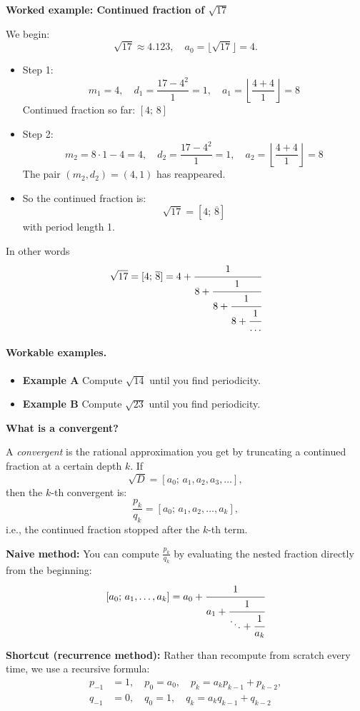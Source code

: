 \documentclass[11pt]{article}
\begin{document}
\bigskip
\noindent
\textbf{Worked example: Continued fraction of \( \sqrt{17} \)}

We begin:
\[
\sqrt{17} \approx 4.123, \quad a_0 = \lfloor \sqrt{17} \rfloor = 4.
\]

\begin{itemize}
  \item Step 1:
  \[
  m_1 = 4, \quad d_1 = \frac{17 - 4^2}{1} = 1, \quad a_1 = \left\lfloor \frac{4 + 4}{1} \right\rfloor = 8
  \]
  Continued fraction so far: \( [4;\,8] \)

  \item Step 2:
  \[
  m_2 = 8 \cdot 1 - 4 = 4, \quad d_2 = \frac{17 - 4^2}{1} = 1, \quad a_2 = \left\lfloor \frac{4 + 4}{1} \right\rfloor = 8
  \]
  The pair \( (m_2, d_2) = (4, 1) \) has reappeared.

  \item So the continued fraction is:
  \[
  \sqrt{17} = [4;\, \overline{8}]
  \]
  with period length 1.
\end{itemize}
\smallskip
\noindent
In other words
\[
\sqrt{17} = [4;\, \overline{8}] = 4 + \cfrac{1}{8 + \cfrac{1}{8 + \cfrac{1}{8 + \cfrac{1}{\dots}}}}
\]

\paragraph{Workable examples.}
\begin{itemize}
  \item \textbf{Example A} Compute $\sqrt{14}$ until you find periodicity.
  \item \textbf{Example B} Compute $\sqrt{23}$ until you find periodicity.
\end{itemize}

\smallskip
\noindent
\textbf{What is a convergent?}

A \emph{convergent} is the rational approximation you get by truncating a continued fraction at a certain depth \( k \). If
\[
\sqrt{D} = [a_0;\, a_1, a_2, a_3, \dots],
\]
then the \( k \)-th convergent is:
\[
\frac{p_k}{q_k} = [a_0;\, a_1, a_2, \dots, a_k],
\]
i.e., the continued fraction stopped after the \( k \)-th term.

\smallskip
\textbf{Naive method:} You can compute \( \frac{p_k}{q_k} \) by evaluating the nested fraction directly from the beginning:
\[
[a_0;\, a_1, \dots, a_k] = a_0 + \cfrac{1}{a_1 + \cfrac{1}{\ddots + \cfrac{1}{a_k}}}
\]

\smallskip
\textbf{Shortcut (recurrence method):} Rather than recompute from scratch every time, we use a recursive formula:
\[
\begin{aligned}
p_{-1} &= 1,\quad p_0 = a_0, \quad p_k = a_k p_{k-1} + p_{k-2}, \\
q_{-1} &= 0,\quad q_0 = 1, \quad q_k = a_k q_{k-1} + q_{k-2}
\end{aligned}
\]
\end{document}
